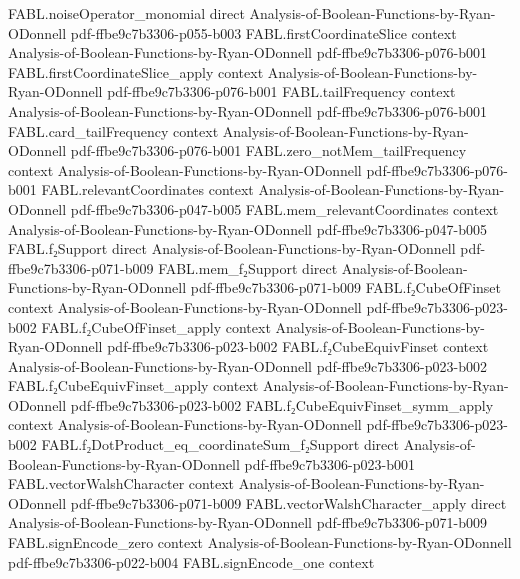 \begin{theorem}
  {FABL.noiseOperator_monomial}
  {direct}
  {Analysis-of-Boolean-Functions-by-Ryan-ODonnell}
  {pdf-ffbe9c7b3306-p055-b003}
\proofstep
  {FABL.firstCoordinateSlice}
  {context}
  {Analysis-of-Boolean-Functions-by-Ryan-ODonnell}
  {pdf-ffbe9c7b3306-p076-b001}
\proofstep
  {FABL.firstCoordinateSlice_apply}
  {context}
  {Analysis-of-Boolean-Functions-by-Ryan-ODonnell}
  {pdf-ffbe9c7b3306-p076-b001}
\proofstep
  {FABL.tailFrequency}
  {context}
  {Analysis-of-Boolean-Functions-by-Ryan-ODonnell}
  {pdf-ffbe9c7b3306-p076-b001}
\proofstep
  {FABL.card_tailFrequency}
  {context}
  {Analysis-of-Boolean-Functions-by-Ryan-ODonnell}
  {pdf-ffbe9c7b3306-p076-b001}
\proofstep
  {FABL.zero_notMem_tailFrequency}
  {context}
  {Analysis-of-Boolean-Functions-by-Ryan-ODonnell}
  {pdf-ffbe9c7b3306-p076-b001}
\proofstep
  {FABL.relevantCoordinates}
  {context}
  {Analysis-of-Boolean-Functions-by-Ryan-ODonnell}
  {pdf-ffbe9c7b3306-p047-b005}
\proofstep
  {FABL.mem_relevantCoordinates}
  {context}
  {Analysis-of-Boolean-Functions-by-Ryan-ODonnell}
  {pdf-ffbe9c7b3306-p047-b005}
\proofstep
  {FABL.f₂Support}
  {direct}
  {Analysis-of-Boolean-Functions-by-Ryan-ODonnell}
  {pdf-ffbe9c7b3306-p071-b009}
\proofstep
  {FABL.mem_f₂Support}
  {direct}
  {Analysis-of-Boolean-Functions-by-Ryan-ODonnell}
  {pdf-ffbe9c7b3306-p071-b009}
\proofstep
  {FABL.f₂CubeOfFinset}
  {context}
  {Analysis-of-Boolean-Functions-by-Ryan-ODonnell}
  {pdf-ffbe9c7b3306-p023-b002}
\proofstep
  {FABL.f₂CubeOfFinset_apply}
  {context}
  {Analysis-of-Boolean-Functions-by-Ryan-ODonnell}
  {pdf-ffbe9c7b3306-p023-b002}
\proofstep
  {FABL.f₂CubeEquivFinset}
  {context}
  {Analysis-of-Boolean-Functions-by-Ryan-ODonnell}
  {pdf-ffbe9c7b3306-p023-b002}
\proofstep
  {FABL.f₂CubeEquivFinset_apply}
  {context}
  {Analysis-of-Boolean-Functions-by-Ryan-ODonnell}
  {pdf-ffbe9c7b3306-p023-b002}
\proofstep
  {FABL.f₂CubeEquivFinset_symm_apply}
  {context}
  {Analysis-of-Boolean-Functions-by-Ryan-ODonnell}
  {pdf-ffbe9c7b3306-p023-b002}
\proofstep
  {FABL.f₂DotProduct_eq_coordinateSum_f₂Support}
  {direct}
  {Analysis-of-Boolean-Functions-by-Ryan-ODonnell}
  {pdf-ffbe9c7b3306-p023-b001}
\proofstep
  {FABL.vectorWalshCharacter}
  {context}
  {Analysis-of-Boolean-Functions-by-Ryan-ODonnell}
  {pdf-ffbe9c7b3306-p071-b009}
\proofstep
  {FABL.vectorWalshCharacter_apply}
  {direct}
  {Analysis-of-Boolean-Functions-by-Ryan-ODonnell}
  {pdf-ffbe9c7b3306-p071-b009}
\proofstep
  {FABL.signEncode_zero}
  {context}
  {Analysis-of-Boolean-Functions-by-Ryan-ODonnell}
  {pdf-ffbe9c7b3306-p022-b004}
\proofstep
  {FABL.signEncode_one}
  {context}

\end{theorem}
